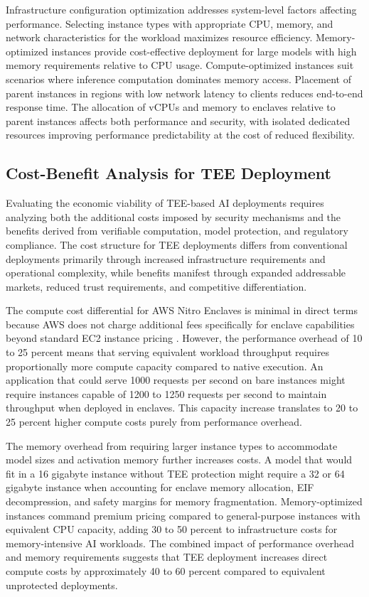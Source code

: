 Infrastructure configuration optimization addresses system-level factors affecting performance. Selecting instance types with appropriate CPU, memory, and network characteristics for the workload maximizes resource efficiency. Memory-optimized instances provide cost-effective deployment for large models with high memory requirements relative to CPU usage. Compute-optimized instances suit scenarios where inference computation dominates memory access. Placement of parent instances in regions with low network latency to clients reduces end-to-end response time. The allocation of vCPUs and memory to enclaves relative to parent instances affects both performance and security, with isolated dedicated resources improving performance predictability at the cost of reduced flexibility.

\subsection{Cost-Benefit Analysis for TEE Deployment}

Evaluating the economic viability of TEE-based AI deployments requires analyzing both the additional costs imposed by security mechanisms and the benefits derived from verifiable computation, model protection, and regulatory compliance. The cost structure for TEE deployments differs from conventional deployments primarily through increased infrastructure requirements and operational complexity, while benefits manifest through expanded addressable markets, reduced trust requirements, and competitive differentiation.

The compute cost differential for AWS Nitro Enclaves is minimal in direct terms because AWS does not charge additional fees specifically for enclave capabilities beyond standard EC2 instance pricing \cite{nitro_security}. However, the performance overhead of 10 to 25 percent means that serving equivalent workload throughput requires proportionally more compute capacity compared to native execution. An application that could serve 1000 requests per second on bare instances might require instances capable of 1200 to 1250 requests per second to maintain throughput when deployed in enclaves. This capacity increase translates to 20 to 25 percent higher compute costs purely from performance overhead.

The memory overhead from requiring larger instance types to accommodate model sizes and activation memory further increases costs. A model that would fit in a 16 gigabyte instance without TEE protection might require a 32 or 64 gigabyte instance when accounting for enclave memory allocation, EIF decompression, and safety margins for memory fragmentation. Memory-optimized instances command premium pricing compared to general-purpose instances with equivalent CPU capacity, adding 30 to 50 percent to infrastructure costs for memory-intensive AI workloads. The combined impact of performance overhead and memory requirements suggests that TEE deployment increases direct compute costs by approximately 40 to 60 percent compared to equivalent unprotected deployments.

